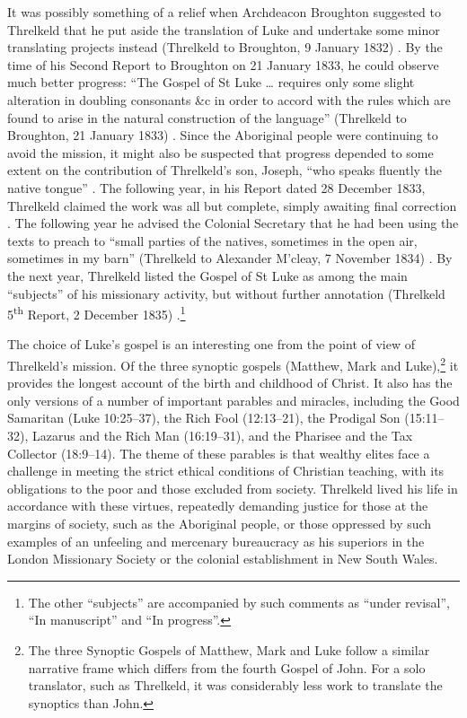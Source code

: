 {It was possibly something of a relief when Archdeacon Broughton suggested to Threlkeld that he put aside the translation of Luke and undertake some minor translating projects instead (Threlkeld to Broughton, 9 January 1832) \citep[115]{gunson_australian_1974a}. By the time of his Second Report to Broughton on 21 January 1833, he could observe much better progress: “The Gospel of St Luke … requires only some slight alteration in doubling consonants \&c in order to accord with the rules which are found to arise in the natural construction of the language” (Threlkeld to Broughton, 21 January 1833) \citep[117]{gunson_australian_1974a}. Since the Aboriginal people were continuing to avoid the mission, it might also be suspected that progress depended to some extent on the contribution of Threlkeld’s son, Joseph, “who speaks fluently the native tongue” \citep[117]{gunson_australian_1974a}. The following year, in his Report dated 28 December 1833, Threlkeld claimed the work was all but complete, simply awaiting final correction \citep[119]{gunson_australian_1974a}. The following year he advised the Colonial Secretary that he had been using the texts to preach to “small parties of the natives, sometimes in the open air, sometimes in my barn” (Threlkeld to Alexander M’cleay, 7 November 1834) \citep[120]{gunson_australian_1974a}. By the next year, Threlkeld listed the Gospel of St Luke as among the main “subjects” of his missionary activity, but without further annotation (Threlkeld 5\textsuperscript{th} Report, 2 December 1835) \citep[123]{gunson_australian_1974a}.\footnote{The other “subjects” are accompanied by such comments as “under revisal”, “In manuscript” and “In progress”.}

The choice of Luke’s gospel is an interesting one from the point of view of Threlkeld’s mission. Of the three synoptic gospels (Matthew, Mark and Luke),\footnote{The three Synoptic Gospels of Matthew, Mark and Luke follow a similar narrative frame which differs from the fourth Gospel of John. For a solo translator, such as Threlkeld, it was considerably less work to translate the synoptics than John.} it provides the longest account of the birth and childhood of Christ. It also has the only versions of a number of important parables and miracles, including the Good Samaritan (Luke 10:25--37), the Rich Fool (12:13--21), the Prodigal Son (15:11--32), Lazarus and the Rich Man (16:19--31), and the Pharisee and the Tax Collector (18:9--14). The theme of these parables is that wealthy elites face a challenge in meeting the strict ethical conditions of Christian teaching, with its obligations to the poor and those excluded from society. Threlkeld lived his life in accordance with these virtues, repeatedly demanding justice for those at the margins of society, such as the Aboriginal people, or those oppressed by such examples of an unfeeling and mercenary bureaucracy as his superiors in the London Missionary Society or the colonial establishment in New South Wales.

}
